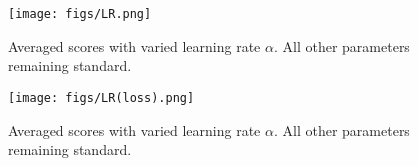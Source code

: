 \documentclass{article}
\begin{document}
\begin{figure}
    \centering
    \texttt{[image: figs/LR.png]}
    \caption{Averaged scores with varied learning rate $\alpha$. All other parameters remaining standard.}
    \label{fig:lr}
\end{figure}

\begin{figure}
    \centering
    \texttt{[image: figs/LR(loss).png]}
    \caption{Averaged scores with varied learning rate $\alpha$. All other parameters remaining standard.}
    \label{fig:lr_loss}
\end{figure}

\newpage
{}


\end{document}
